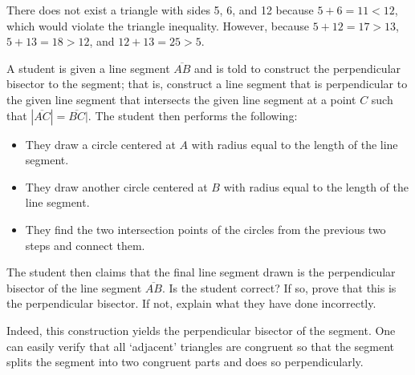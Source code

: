\documentclass[11pt,letterpaper]{article}
\begin{document}
There does not exist a triangle with sides 5, 6, and 12 because $5 + 6= 11 < 12$, which would violate the triangle inequality. However, because $5 + 12= 17 > 13$, $5 + 13= 18 > 12$, and $12 + 13= 25 > 5$. 



\newpage



 A student is given a line segment $\overline{AB}$ and is told to construct the perpendicular bisector to the segment; that is, construct a line segment that is perpendicular to the given line segment that intersects the given line segment at a point $C$ such that $|\overline{AC}|= \overline{BC}|$. The student then performs the following:
	\begin{itemize}
	\item They draw a circle centered at $A$ with radius equal to the length of the line segment. 
	\item They draw another circle centered at $B$ with radius equal to the length of the line segment. 
	\item They find the two intersection points of the circles from the previous two steps and connect them.
	\end{itemize}
The student then claims that the final line segment drawn is the perpendicular bisector of the line segment $\overline{AB}$. Is the student correct? If so, prove that this is the perpendicular bisector. If not, explain what they have done incorrectly. \pspace

\sol Indeed, this construction yields the perpendicular bisector of the segment. One can easily verify that all `adjacent' triangles are congruent so that the segment splits the segment into two congruent parts and does so perpendicularly. 
\end{document}

